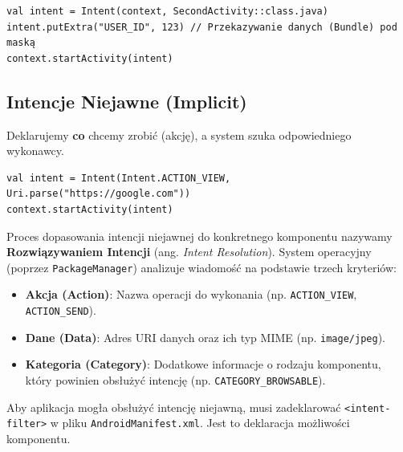 \begin{verbatim}
val intent = Intent(context, SecondActivity::class.java)
intent.putExtra("USER_ID", 123) // Przekazywanie danych (Bundle) pod maską
context.startActivity(intent)
\end{verbatim}

\subsection{Intencje Niejawne (Implicit)}
Deklarujemy \textbf{co} chcemy zrobić (akcję), a system szuka odpowiedniego wykonawcy.
\begin{verbatim}
val intent = Intent(Intent.ACTION_VIEW, Uri.parse("https://google.com"))
context.startActivity(intent)
\end{verbatim}

Proces dopasowania intencji niejawnej do konkretnego komponentu nazywamy \textbf{Rozwiązywaniem Intencji} (ang. \textit{Intent Resolution}). System operacyjny (poprzez \texttt{PackageManager}) analizuje wiadomość na podstawie trzech kryteriów:
\begin{itemize}
    \item \textbf{Akcja (Action)}: Nazwa operacji do wykonania (np. \texttt{ACTION\_VIEW}, \texttt{ACTION\_SEND}).
    \item \textbf{Dane (Data)}: Adres URI danych oraz ich typ MIME (np. \texttt{image/jpeg}).
    \item \textbf{Kategoria (Category)}: Dodatkowe informacje o rodzaju komponentu, który powinien obsłużyć intencję (np. \texttt{CATEGORY\_BROWSABLE}).
\end{itemize}

Aby aplikacja mogła obsłużyć intencję niejawną, musi zadeklarować \texttt{<intent-filter>} w pliku \texttt{AndroidManifest.xml}. Jest to deklaracja możliwości komponentu.

